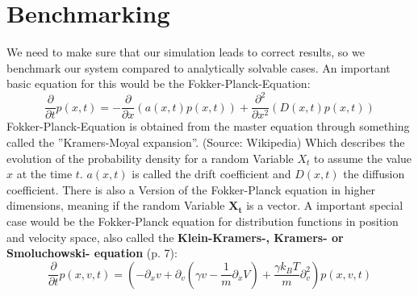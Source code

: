 	\section{Benchmarking}
	We need to make sure that our simulation leads to correct results, so we benchmark our system compared to analytically solvable cases. An important basic equation for this would be the Fokker-Planck-Equation:
	\begin{equation}
		\frac{\partial}{\partial t} p(x, t) = -\frac{\partial}{\partial x}(a(x, t)p(x,t)) + \frac{\partial^2}{\partial x^2}(D(x, t)p(x,t))
	\end{equation}
	Fokker-Planck-Equation is obtained from the master equation through something called the ''Kramers-Moyal expansion''.
	(Source: Wikipedia)
	Which describes the evolution of the probability density for a random Variable $X_t$ to assume the value $x$ at the time $t$. $a(x, t)$ is called the drift coefficient and $D(x, t)$ the diffusion coefficient. There is also a Version of the Fokker-Planck equation in higher dimensions, meaning if the random Variable $\mathbf{X_t}$ is a vector. A important special case would be the Fokker-Planck equation for distribution functions in position and velocity space, also called the \textbf{Klein-Kramers-, Kramers- or Smoluchowski- equation} \cite{risken1996fokker}(p. 7):
	\begin{equation}
		\frac{\partial}{\partial t} p(x, v, t) = \left(-\partial_x v + \partial_v\left(\gamma v - \frac{1}{m} \partial_x V\right) + \frac{\gamma k_B T}{m} \partial_v^2\right)p(x, v, t)
	\end{equation}
	
	
